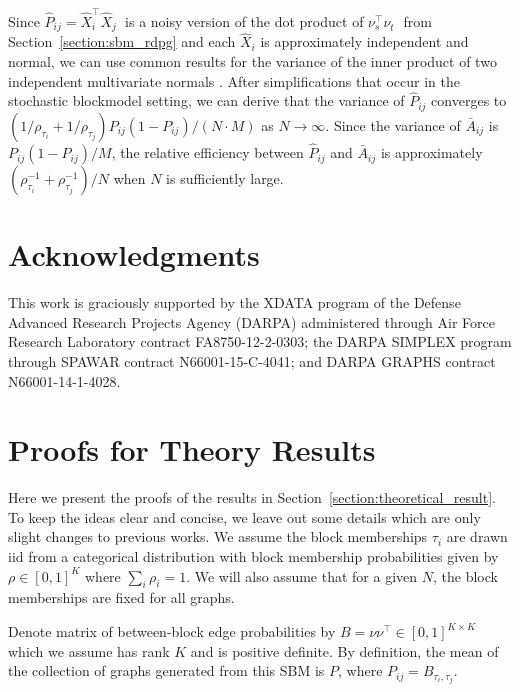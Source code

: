 \documentclass[10pt,letterpaper]{article}
\renewcommand{\hat}{\widehat}
\begin{document}
Since $\hat{P}_{ij} = \hat{X}_i^{\top} \hat{X}_j^{\phantom{\top}}$ is a noisy version of the dot product of $\nu_s^{\top} \nu_t^{\phantom{\top}}$ from Section~\ref{section:sbm_rdpg} and each $\hat{X}_i$ is approximately independent and normal, we can use common results for the variance of the inner product of two independent multivariate normals \citep{brown1977means}.
After simplifications that occur in the stochastic blockmodel setting, we can derive that the variance of $\hat{P}_{ij}$ converges to $\left( 1/\rho_{\tau_i} + 1/\rho_{\tau_j} \right) P_{ij} (1-P_{ij})/(N \cdot M)$ as $N \rightarrow \infty$. 
Since the variance of $\bar{A}_{ij}$ is $P_{ij} (1-P_{ij})/M$, the relative efficiency between $\hat{P}_{ij}$ and $\bar{A}_{ij}$ is approximately $(\rho_{\tau_i}^{-1} + \rho_{\tau_j}^{-1})/N$ when $N$ is sufficiently large.
    

\section*{Acknowledgments}

This work is graciously supported by the XDATA program of the Defense
Advanced Research Projects Agency (DARPA) administered through Air
Force Research Laboratory contract FA8750-12-2-0303; the DARPA SIMPLEX
program through SPAWAR contract N66001-15-C-4041; and DARPA GRAPHS
contract N66001-14-1-4028.

\nolinenumbers






\appendix

\section{Proofs for Theory Results}
Here we present the proofs of the results in Section~\ref{section:theoretical_result}. To keep the ideas clear and concise, we leave out some details which are only slight changes to previous works.
We assume the block memberships $\tau_i$ are drawn iid from a categorical distribution with block membership probabilities given by $\rho\in[0,1]^K$ where $\sum_i \rho_i =1$.
We will also assume that for a given $N$, the block memberships are fixed for all graphs.

Denote matrix of between-block edge probabilities by $B = \nu \nu^{\top} \in[0,1]^{K\times K}$ which we assume has rank $K$ and is positive definite. 
By definition, the mean of the collection of graphs generated from this SBM is $P$, where $P_{ij} = B_{\tau_i, \tau_j}$. 
\end{document}
